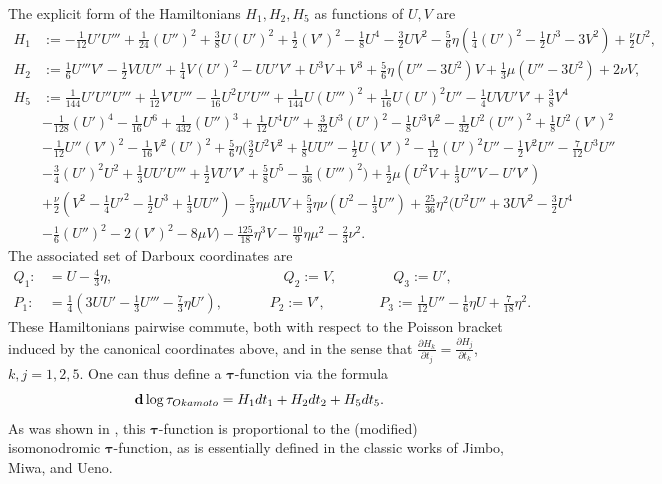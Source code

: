 \documentclass[usenames,dvipsnames]{article}
\theoremstyle{definition}
\numberwithin{equation}{section}
\numberwithin{figure}{section}
\begin{document}
The explicit form of the Hamiltonians $H_1,H_2,H_5$ as functions of $U,V$ are
    \begin{align*}
        H_1 &:= -\frac{1}{12}U'U''' +\frac{1}{24}(U'')^2 + \frac{3}{8}U(U')^2 +\frac{1}{2}(V')^2 - \frac{1}{8}U^4 - \frac{3}{2}UV^2 -\frac{5}{6}\eta\left(\frac{1}{4}(U')^2 - \frac{1}{2}U^3 - 3 V^2\right) + \frac{\nu}{2}U^2,\\
        H_2 &:= \frac{1}{6}U'''V' -\frac{1}{2}VUU''+\frac{1}{4}V(U')^2 - UU'V'+U^3V+V^3+\frac{5}{6}\eta\left(U''-3U^2\right)V + \frac{1}{3}\mu(U''-3U^2) + 2\nu V,\\
        H_5 &:= \frac{1}{144}U'U''U'''+\frac{1}{12}V'U'''-\frac{1}{16}U^2U'U'''+\frac{1}{144}U(U''')^2+\frac{1}{16}U(U')^2U''-\frac{1}{4}UVU'V' + \frac{3}{8}V^4\\
        &-\frac{1}{128}(U')^4-\frac{1}{16}U^6+\frac{1}{432}(U'')^3+\frac{1}{12}U^4U''+\frac{3}{32}U^3(U')^2-\frac{1}{8}U^3V^2-\frac{1}{32}U^2(U'')^2+\frac{1}{8}U^2(V')^2\\
        &-\frac{1}{12}U''(V')^2-\frac{1}{16}V^2(U')^2 + 
        \frac{5}{6}\eta\bigg(\frac{3}{2}U^2V^2+\frac{1}{8}UU''-\frac{1}{2}U(V')^2-\frac{1}{12}(U')^2U''-\frac{1}{2}V^2U''-\frac{7}{12}U^3U''\\
        &-\frac{3}{4}(U')^2U^2+\frac{1}{3}UU'U'''+\frac{1}{2}VU'V'+\frac{5}{8}U^5-\frac{1}{36}(U''')^2\bigg) + \frac{1}{2}\mu\left(U^2V+\frac{1}{3}U''V-U'V'\right)\\
        &+ \frac{\nu}{2}\left(V^2-\frac{1}{4}U'^2-\frac{1}{2}U^3+\frac{1}{3}UU''\right) - \frac{5}{3}\eta\mu UV + \frac{5}{3}\eta\nu\left(U^2-\frac{1}{3}U''\right) + \frac{25}{36}\eta^2\bigg(U^2U''+3UV^2-\frac{3}{2}U^4\\
        &-\frac{1}{6}(U'')^2-2(V')^2-8\mu V\bigg) - \frac{125}{18}\eta^3V -\frac{10}{9}\eta\mu^2-\frac{2}{3}\nu^2.
    \end{align*}
The associated set of Darboux coordinates are
        \begin{align}
            Q_1 :&= U - \frac{4}{3}\eta, \qquad\qquad\qquad\qquad\qquad\qquad\, Q_2 := V, \qquad\qquad  Q_3 := U', \label{Darboux-Q}\\
            P_1 :&= \frac{1}{4}\left( 3UU' - \frac{1}{3}U''' - \frac{7}{3}\eta U'\right), \qquad\quad\,\, P_2 := V', \qquad\quad\,\,\,\,\, P_3 := \frac{1}{12}U''-\frac{1}{6}\eta U + \frac{7}{18}\eta^2.\label{Darboux-P}
        \end{align}
These Hamiltonians pairwise commute, both with respect to the Poisson bracket induced by the canonical coordinates above, and in the sense that $\frac{\partial H_k}{\partial t_j} = \frac{\partial H_j}{\partial t_k}$, $k,j = 1,2,5$. One can thus define a $\boldsymbol{\tau}$-function via the formula
    \begin{equation}\label{tau-okamoto}
        {\bf d}\log \tau_{Okamoto} = H_1 dt_1 + H_2 dt_2 + H_5 dt_5.
    \end{equation}
As was shown in \cite{DHL2}, this $\boldsymbol{\tau}$-function is proportional to the (modified) isomonodromic $\boldsymbol{\tau}$-function, as is essentially defined in the
classic works of Jimbo, Miwa, and Ueno.
\end{document}
